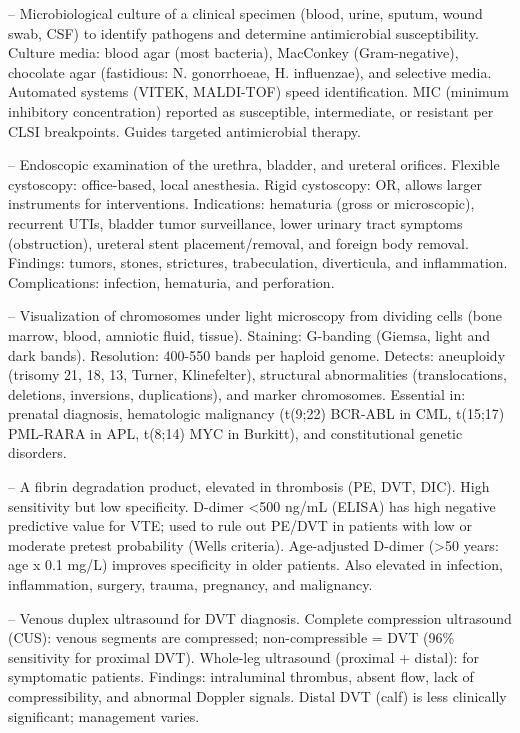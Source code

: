 -- Microbiological culture of a clinical specimen (blood, urine, sputum, wound swab, CSF) to identify pathogens and determine antimicrobial susceptibility. Culture media: blood agar (most bacteria), MacConkey (Gram-negative), chocolate agar (fastidious: N. gonorrhoeae, H. influenzae), and selective media. Automated systems (VITEK, MALDI-TOF) speed identification. MIC (minimum inhibitory concentration) reported as susceptible, intermediate, or resistant per CLSI breakpoints. Guides targeted antimicrobial therapy.

-- Endoscopic examination of the urethra, bladder, and ureteral orifices. Flexible cystoscopy: office-based, local anesthesia. Rigid cystoscopy: OR, allows larger instruments for interventions. Indications: hematuria (gross or microscopic), recurrent UTIs, bladder tumor surveillance, lower urinary tract symptoms (obstruction), ureteral stent placement/removal, and foreign body removal. Findings: tumors, stones, strictures, trabeculation, diverticula, and inflammation. Complications: infection, hematuria, and perforation.

-- Visualization of chromosomes under light microscopy from dividing cells (bone marrow, blood, amniotic fluid, tissue). Staining: G-banding (Giemsa, light and dark bands). Resolution: 400-550 bands per haploid genome. Detects: aneuploidy (trisomy 21, 18, 13, Turner, Klinefelter), structural abnormalities (translocations, deletions, inversions, duplications), and marker chromosomes. Essential in: prenatal diagnosis, hematologic malignancy (t(9;22) BCR-ABL in CML, t(15;17) PML-RARA in APL, t(8;14) MYC in Burkitt), and constitutional genetic disorders.

-- A fibrin degradation product, elevated in thrombosis (PE, DVT, DIC). High sensitivity but low specificity. D-dimer <500 ng/mL (ELISA) has high negative predictive value for VTE; used to rule out PE/DVT in patients with low or moderate pretest probability (Wells criteria). Age-adjusted D-dimer (>50 years: age x 0.1 mg/L) improves specificity in older patients. Also elevated in infection, inflammation, surgery, trauma, pregnancy, and malignancy.

-- Venous duplex ultrasound for DVT diagnosis. Complete compression ultrasound (CUS): venous segments are compressed; non-compressible = DVT (96\% sensitivity for proximal DVT). Whole-leg ultrasound (proximal + distal): for symptomatic patients. Findings: intraluminal thrombus, absent flow, lack of compressibility, and abnormal Doppler signals. Distal DVT (calf) is less clinically significant; management varies.

